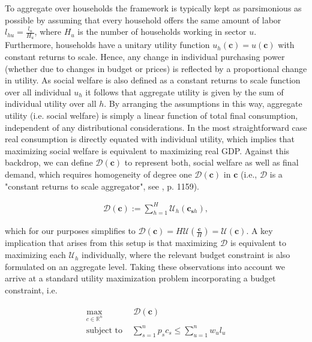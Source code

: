 To aggregate over households the framework is typically kept as parsimonious as possible by assuming that every household offers the same amount of labor $l_{hu} = \frac{l_u}{H_u}$, where $H_u$ is the number of households working in sector $u$. Furthermore, households have a unitary utility function $u_h(\mathbf c) = u(\mathbf c)$ with constant returns to scale. Hence, any change in individual purchasing power (whether due to changes in budget or prices) is reflected by a proportional change in utility. As social welfare is also defined as a constant returns to scale function over all individual $u_h$ it follows that aggregate utility is given by the sum of individual utility over all $h$. By arranging the assumptions in this way, aggregate utility (i.e. social welfare) is simply a linear function of total final consumption, independent of any distributional considerations. In the most straightforward case real consumption is directly equated with individual utility, which implies that maximizing social welfare is equivalent to maximizing real GDP. Against this backdrop, we can define $\mathcal D(\mathbf c)$ to represent both, social welfare as well as final demand, which requires homogeneity of degree one $\mathcal D(\mathbf c)$ in $\mathbf c$ (i.e., $\mathcal D$ is a "constant returns to scale aggregator", see \citealp{BF2019}, p. 1159).

\begin{align}
  \mathcal D(\mathbf c) := \sum_{h  = 1}^H \mathcal U_h(\mathbf{c}_{\mathbf{s} h}), 
\end{align}

which for our purposes simplifies to $\mathcal D(\mathbf c) =  H \mathcal U(\frac{\mathbf c}{H}) = \mathcal U(\mathbf c).$
A key implication that arises from this setup is that maximizing $\mathcal D$ is equivalent to maximizing each $\mathcal U_h$ individually, where the relevant budget constraint is also formulated on an aggregate level. Taking these observations into account we arrive at a standard utility maximization problem incorporating a budget constraint, i.e.

\begin{gather}
  \label{eq:cgutilitymax}
  \begin{split}
  \max_{c \in \mathbb R^n} & \, \mathcal D(\mathbf c)  \\
  \text{subject to } &\sum_{s=1}^n  p_s c_s  \leq \sum_{u=1}^n w_u l_u  \\
  \end{split}
\end{gather}


